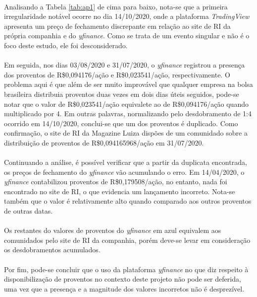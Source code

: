 \paragraph{} Analisando a Tabela \ref{tab:ap1} de cima para baixo, nota-se que a primeira irregularidade notável ocorre no dia 14/10/2020, onde a plataforma \textit{TradingView} apresenta um preço de fechamento discrepante em relação ao site de RI da própria companhia e do \textit{yfinance}. Como se trata de um evento singular e não é o foco deste estudo, ele foi desconsiderado.

\paragraph{} Em seguida, nos dias 03/08/2020 e 31/07/2020, o \textit{yfinance} registrou a presença dos proventos de R\$0,094176/ação e R\$0,023541/ação, respectivamente. O problema aqui é que além de ser muito improvável que qualquer empresa na bolsa brasileira distribuia proventos duas vezes em dois dias úteis seguidos, pode-se notar que o valor de R\$0,023541/ação equivalete ao de R\$0,094176/ação quando multiplicado por 4. Em outras palavras, normalizando pelo desdobramento de 1:4 ocorrido em 14/10/2020, conclui-se que um dos proventos é duplicado. Como confirmação, o site de RI da Magazine Luiza dispões de um comunidado sobre a distribuição de proventos de R\$0,094165968/ação em 31/07/2020.

\paragraph{} Continuando a análise, é possível verificar que a partir da duplicata encontrada, os preços de fechamento do \textit{yfinance} vão acumulando o erro. Em 14/04/2020, o \textit{yfinance} contabilizou proventos de R\$0,179508/ação, no entanto, nada foi encontrado no site de RI, o que evidencia um lançamento incorreto. Nota-se também que o valor é relativamente alto quando comparado aos outros proventos de outras datas.

\paragraph{} Os restantes do valores de proventos do \textit{yfinance} em azul equivalem aos comunidados pelo site de RI da companhia, porém deve-se levar em consideração os desdobramentos acumulados.

\paragraph{} Por fim, pode-se concluir que o uso da plataforma \textit{yfinance} no que diz respeito à disponibilização de proventos no contexto deste projeto não pode ser deferida, uma vez que a presença e a magnitude dos valores incorretos não é desprezível.


